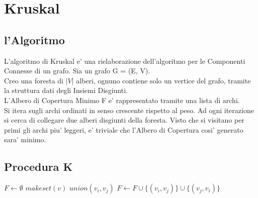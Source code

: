 \chapter{Kruskal}

\section{l'Algoritmo}

L'algoritmo di Kruskal e' una rielaborazione dell'algoritmo per le Componenti Connesse di un grafo. Sia un grafo G = (E, V). \\
Creo una foresta di $|V|$ alberi, ognuno contiene solo un vertice del grafo, tramite la struttura dati degli Insiemi Disgiunti. \\
L'Albero di Copertura Minimo F e' rappresentato tramite una lista di archi. \\
Si itera sugli archi ordinati in senso crescente rispetto al peso. Ad ogni iterazione si cerca di collegare due alberi disgiunti della foresta.
Visto che si visitano per primi gli archi piu' leggeri, e' triviale che l'Albero di Copertura cosi' generato sara' minimo.

\newpage

\section{Procedura K}

\begin{algorithm}
    \begin{algorithmic}
            \State $F \gets \emptyset$
                \State $makeset(v)$
            \EndFor
                    \State $union(v_i, v_j)$
                    \State $F \gets F \cup \{(v_i, v_j)\} \cup \{(v_j, v_i)\}$
                \EndIf
            \EndFor
        \EndProcedure
    \end{algorithmic}
\end{algorithm}
